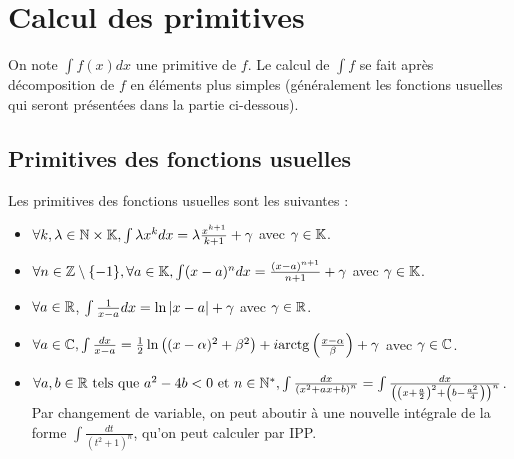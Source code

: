 \documentclass[12pt, a4paper]{report}
\begin{document}
\chapter{Calcul des primitives}

On note $\int f(x)dx$ une primitive de $f$.
Le calcul de $\int f$ se fait après décomposition de $f$ en éléments plus simples (généralement les fonctions usuelles qui seront présentées dans la partie ci-dessous).

\section{Primitives des fonctions usuelles}

Les primitives des fonctions usuelles sont les suivantes :

\begin{itemize}
    \item $\forall k,\lambda \in \mathbb{N}\times\mathbb{K}, \int \lambda x^k dx = \lambda \frac{x^{k+1}}{k+1} + \gamma$ avec $\gamma \in \mathbb{K}$.
    \item $\forall n \in \mathbb{Z}\setminus\{-1\}, \forall a \in \mathbb{K}, \int (x-a)^n dx = \frac{(x-a)^{n+1}}{n+1} + \gamma$ avec $\gamma \in \mathbb{K}$.
    \item $\forall a \in \mathbb{R}$, $\int \frac{1}{x-a} dx = \ln\left|x-a\right| + \gamma$ avec $\gamma \in \mathbb{R}$.
    \item $\forall a \in \mathbb{C}, \int \frac{dx}{x-a} = \frac12 \ln\left((x-\alpha)^2+\beta^2\right) + i\mathrm{arctg}\left(\frac{x-\alpha}{\beta}\right)+\gamma$ avec $\gamma \in \mathbb{C}$.
    \item $\forall a,b\in\mathbb{R} \text{ tels que } a^2-4b<0 \text{ et } n\in \mathbb{N}^*, \int \frac{dx}{\left(x^2+ax+b\right)^n}=\int \frac{dx}{\left(\left(x+\frac{a}{2}\right)^2+\left(b-\frac{a^2}{4}\right)\right)^n}$.\\Par changement de variable, on peut aboutir à une nouvelle intégrale de la forme $\int \frac{dt}{(t^2+1)^n}$, qu'on peut calculer par IPP.
\end{itemize}
\end{document}
